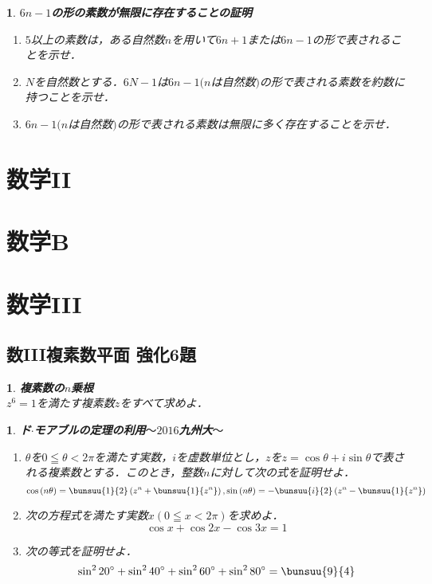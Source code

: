 \documentclass[10pt,
fleqn,
dvipdfmx,
uplatex
]{jsarticle}
\newtheorem{question}[Question]{}
\begin{document}
\begin{question}{\bf\boldmath $6n-1$の形の素数が無限に存在することの証明}\\

\begin{enumerate}
\item $5$以上の素数は，ある自然数$n$を用いて$6n+1$または$6n-1$の形で表されることを示せ．
\item $N$を自然数とする．$6N-1$は$6n-1(n$は自然数$)$の形で表される素数を約数に持つことを示せ．
\item $6n-1(n$は自然数$)$の形で表される素数は無限に多く存在することを示せ．
\end{enumerate}

\end{question}

\section{数学II}

\section{数学B}

\section{数学III}

\subsection{数III複素数平面 強化6題}



\begin{question}{\bf\boldmath 複素数の$n$乗根}\\
$z^6=1$を満たす複素数$z$をすべて求めよ．
\end{question}



\begin{question}{\bf\boldmath ド$\cdot$モアブルの定理の利用$〜2016$九州大$〜$}\\

\begin{enumerate}
\item $\theta$を$0\leqq \theta <2\pi$を満たす実数，$i$を虚数単位とし，$z$を$z=\cos \theta +i\sin \theta$で表される複素数とする．このとき，整数$n$に対して次の式を証明せよ．
\[\cos \left(n\theta \right)=\bunsuu{1}{2}\left(z^n+\bunsuu{1}{{}z^n}\right), \sin \left(n\theta \right)=-\bunsuu{i}{2}\left(z^n-\bunsuu{1}{{}z^n}\right)\]
\item 次の方程式を満たす実数$x\left(0\leqq x<2\pi \right)$を求めよ．
\[\cos x+\cos 2x-\cos 3x=1\]
\item 次の等式を証明せよ．
\[\sin ^2{20}^\circ +\sin ^2{40}^\circ +\sin ^2{60}^\circ +\sin ^2{80}^\circ =\bunsuu{9}{4}\]
\end{enumerate}

\end{question}
\end{document}
